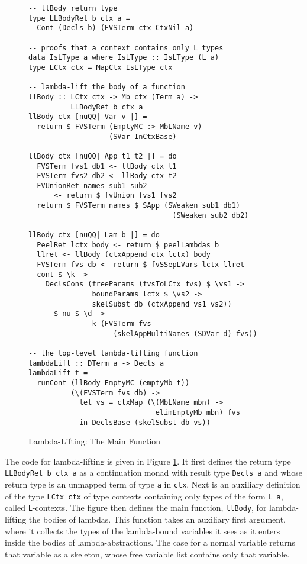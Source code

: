\documentclass[natbib]{sigplanconf}
\begin{document}
\begin{figure}[t]
\vspace{-5pt}
\begin{lstlisting}[basicstyle=\ttfamily\scriptsize]
-- llBody return type
type LLBodyRet b ctx a =
  Cont (Decls b) (FVSTerm ctx CtxNil a)

-- proofs that a context contains only L types
data IsLType a where IsLType :: IsLType (L a)
type LCtx ctx = MapCtx IsLType ctx

-- lambda-lift the body of a function
llBody :: LCtx ctx -> Mb ctx (Term a) ->
          LLBodyRet b ctx a
llBody ctx [nuQQ| Var v |] =
  return $ FVSTerm (EmptyMC :> MbLName v)
                   (SVar InCtxBase)

llBody ctx [nuQQ| App t1 t2 |] = do
  FVSTerm fvs1 db1 <- llBody ctx t1
  FVSTerm fvs2 db2 <- llBody ctx t2
  FVUnionRet names sub1 sub2
      <- return $ fvUnion fvs1 fvs2
  return $ FVSTerm names $ SApp (SWeaken sub1 db1)
                                  (SWeaken sub2 db2)

llBody ctx [nuQQ| Lam b |] = do
  PeelRet lctx body <- return $ peelLambdas b
  llret <- llBody (ctxAppend ctx lctx) body
  FVSTerm fvs db <- return $ fvSSepLVars lctx llret
  cont $ \k ->
    DeclsCons (freeParams (fvsToLCtx fvs) $ \vs1 ->
               boundParams lctx $ \vs2 ->
               skelSubst db (ctxAppend vs1 vs2))
      $ nu $ \d ->
               k (FVSTerm fvs
                    (skelAppMultiNames (SDVar d) fvs))

-- the top-level lambda-lifting function
lambdaLift :: DTerm a -> Decls a
lambdaLift t =
  runCont (llBody EmptyMC (emptyMb t))
          (\(FVSTerm fvs db) ->
            let vs = ctxMap (\(MbLName mbn) ->
                              elimEmptyMb mbn) fvs
            in DeclsBase (skelSubst db vs))
\end{lstlisting}
\caption{Lambda-Lifting: The Main Function}
\label{fig:lambda-lifting}
\end{figure} %


The code for lambda-lifting is given in Figure
\ref{fig:lambda-lifting}. It first defines the return type
\lstinline{LLBodyRet b ctx a} as a continuation monad with result type
\lstinline{Decls a} and whose return type is an unmapped term of type
\lstinline{a} in \lstinline{ctx}. Next is an auxiliary definition of
the type \lstinline{LCtx ctx} of type contexts containing only types
of the form \lstinline{L a}, called \lstinline{L}-contexts.
The figure then defines the main function,
\lstinline{llBody}, for lambda-lifting the bodies of lambdas.  This
function takes an auxiliary first argument, where it collects the
types of the lambda-bound variables it sees as it enters inside the
bodies of lambda-abstractions. The case for a normal variable returns
that variable as a skeleton, whose free variable list contains only
that variable.
\end{document}
